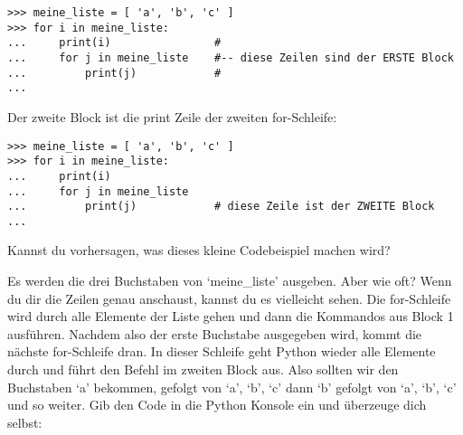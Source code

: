 \begin{listing}
\begin{verbatim}
>>> meine_liste = [ 'a', 'b', 'c' ]
>>> for i in meine_liste:
...     print(i)                #
...     for j in meine_liste    #-- diese Zeilen sind der ERSTE Block
...         print(j)            #
...
\end{verbatim}
\end{listing}


Der zweite Block ist die print Zeile der zweiten for-Schleife:

\begin{listing}
\begin{verbatim}
>>> meine_liste = [ 'a', 'b', 'c' ]
>>> for i in meine_liste:
...     print(i)                
...     for j in meine_liste    
...         print(j)            # diese Zeile ist der ZWEITE Block
...
\end{verbatim}
\end{listing}

Kannst du vorhersagen, was dieses kleine Codebeispiel machen wird?
\par
Es werden die drei Buchstaben von `meine\_liste' ausgeben. Aber wie oft? Wenn du dir die Zeilen genau anschaust, kannst du es vielleicht sehen. Die for-Schleife wird durch alle Elemente der Liste gehen und dann die Kommandos aus Block 1 ausführen. Nachdem also der erste Buchstabe ausgegeben wird, kommt die nächste for-Schleife dran. In dieser Schleife geht Python wieder alle Elemente durch und führt den Befehl im zweiten Block aus. Also sollten wir den Buchstaben `a' bekommen, gefolgt von `a', `b', `c' dann `b' gefolgt von `a', `b', `c' und so weiter. Gib den Code in die Python Konsole ein und überzeuge dich selbst:

